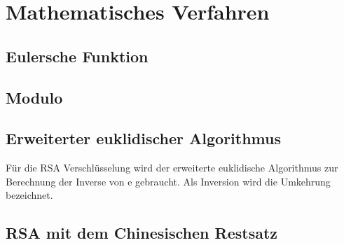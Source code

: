 \section{Mathematisches Verfahren}
\subsection{Eulersche Funktion}
\subsection{Modulo}
\subsection{Erweiterter euklidischer Algorithmus}
Für die RSA Verschlüsselung wird der erweiterte euklidische Algorithmus zur Berechnung der Inverse von e gebraucht. Als Inversion wird die Umkehrung bezeichnet. 
\subsection{RSA mit dem Chinesischen Restsatz}
